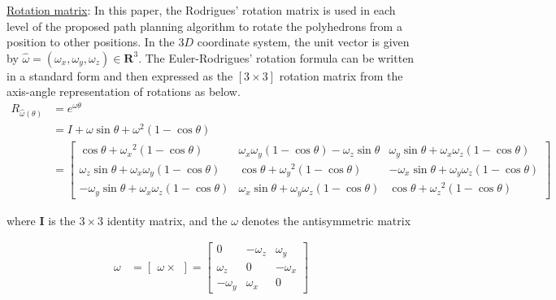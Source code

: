 %
\noindent \uline{Rotation matrix}: 
In this paper, the Rodrigues' rotation matrix \cite{Dai_Rodrigues_2015} is used in each level of the proposed path planning algorithm to rotate the polyhedrons from a position to other positions.
%
In the $3D$ coordinate system, the unit vector is given by $\hat{\omega}=(\omega_x,\omega_y,\omega_z)\in{\textbf{R}^3}$.
The Euler-Rodrigues' rotation formula can be written in a standard form and then expressed as the $[3\times3]$ rotation matrix from the axis-angle representation of rotations as below.
\begin{equation}
\begin{split}
R_{\hat{\omega}(\theta)} &= {e^{\omega\theta}}\\
	&= I + \omega\sin{\theta} + {\omega}^2(1-\cos{\theta})\\
	&= {
		\begin{bmatrix}
			{\cos{\theta}+{\omega_x}^2(1-\cos{\theta})} & {\omega_x\omega_y(1-\cos{\theta})-\omega_z{\sin\theta}} & {\omega_y\sin{\theta}+\omega_x\omega_z(1-\cos{\theta})}\\
			{\omega_z\sin{\theta}+\omega_x\omega_y(1-\cos{\theta})} & {\cos{\theta}+{\omega_y}^2(1-\cos{\theta})} & {-\omega_x\sin{\theta}+\omega_y\omega_z(1-\cos{\theta})}\\
			{-\omega_y\sin{\theta}+\omega_x\omega_z(1-\cos{\theta})} & {\omega_x\sin{\theta}+\omega_y\omega_z(1-\cos{\theta})} & {\cos{\theta}+{\omega_z}^2(1-\cos{\theta})}
		\end{bmatrix}
		}
\end{split}
\end{equation}

where \textbf{I} is the $3\times3$ identity matrix, and the $\omega$ denotes the antisymmetric matrix 

\begin{equation*}
\begin{split}
\omega &= {
		\begin{bmatrix}
			\omega\times
		\end{bmatrix}
		}
		= {
		\begin{bmatrix}
			0 & -\omega_z & \omega_y \\
			\omega_z & 0 & -\omega_x \\
			-\omega_y & \omega_x & 0
		\end{bmatrix}
		}
\end{split}
\end{equation*}

